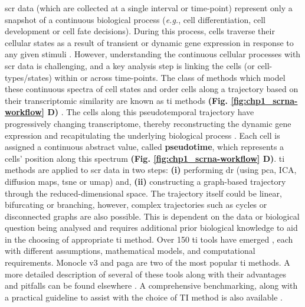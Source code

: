\par \gls{scr} data (which are collected at a single interval or time-point) represent only a snapshot of a continuous biological process (\textit{e.g.}, cell differentiation, cell development or cell fate decisions). During this process, cells traverse their cellular states as a result of transient or dynamic gene expression in response to any given stimuli \textbf{\cite{zeng_what_2022}}. However, understanding the continuous cellular processes with \gls{scr} data is challenging, and a key analysis step is linking the cells (or cell-types/states) within or across time-points. The class of methods which model these continuous spectra of cell states and order cells along a trajectory based on their transcriptomic similarity are known as \gls{ti} methods \textbf{(Fig. \ref{fig:chp1_scrna-workflow} D)} \textbf{\cite{ weiler_guide_2022}}. The cells along this pseudotemporal trajectory have progressively changing transcriptome, thereby reconstructing the dynamic gene expression and recapitulating the underlying biological process \textbf{\cite{hou_statistical_2023}}. Each cell is assigned a continuous abstract value, called \textbf{pseudotime}, which represents a cells’ position along this spectrum \textbf{(Fig. \ref{fig:chp1_scrna-workflow} D)}.
\gls{ti} methods are applied to \gls{scr} data in two steps: \textbf{(i)} performing \gls{dr} (using \gls{pca}, ICA, diffusion maps, \gls{tsne} or \gls{umap}) and, \textbf{(ii)} constructing a graph-based trajectory through the reduced-dimensional space. The trajectory itself could be linear, bifurcating or branching, however, complex trajectories such as cycles or disconnected graphs are also possible. This is dependent on the data or biological question being analysed and requires additional prior biological knowledge to aid in the choosing of appropriate \gls{ti} method. Over 150 \gls{ti} tools have emerged \textbf{\cite{noauthor_scrna-tools_nodate,zappia_exploring_2018}}, each with different assumptions, mathematical models, and computational requirements. Monocle v3 \textbf{\cite{cao_single-cell_2019}} and \gls{paga} \textbf{\cite{wolf_paga_2019}} are two of the most popular \gls{ti} methods. A more detailed description of several of these tools along with their advantages and pitfalls can be found elsewhere \textbf{\cite{ding_temporal_2022,deconinck_recent_2021,cannoodt_computational_2016,saelens_comparison_2019}}. A comprehensive benchmarking, along with a practical guideline to assist with the choice of TI method is also available \textbf{\cite{saelens_comparison_2019}}. %

